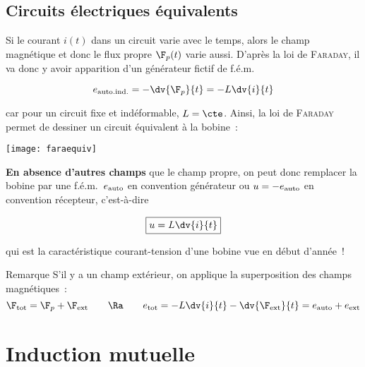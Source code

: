 \documentclass[../main/main.tex]{subfiles}
\begin{document}
\subsection{Circuits électriques équivalents}
\label{ssec:celecequiv}
Si le courant $i(t)$ dans un circuit varie avec le temps, alors le champ
magnétique et donc le flux propre $\F_p(t)$ varie aussi. D'après la loi de
\textsc{Faraday}, il va donc y avoir apparition d'un générateur fictif de
f.é.m.\
\begin{hide}
	\[
		e_{\rm auto.ind.} = -\dv{\F_p}{t} = -L \dv{i}{t}
	\]
\end{hide}
car pour un circuit fixe et indéformable, $L = \cte$. Ainsi, la loi de
\textsc{Faraday} permet de dessiner un circuit équivalent à la bobine~:
\begin{hide}
	\begin{center}
		\texttt{[image: faraequiv]}
		\label{fig:faraequiv}
	\end{center}
\end{hide}
\textbf{En absence d'autres champs} que le champ propre, on peut donc remplacer
la bobine par une f.é.m.\ $e_{\rm auto}$ en convention générateur ou $u =
	-e_{\rm auto}$ en convention récepteur, c'est-à-dire
\begin{hide}
	\[
		\boxed{u = L \dv{i}{t}}
	\]
\end{hide}
qui est la caractéristique courant-tension d'une bobine vue en début d'année~!

\begin{rrema}{Remarque}
	S'il y a un champ extérieur, on applique la superposition des champs
	magnétiques~:
	\[
		\F_{\rm tot} = \F_p + \F_{\rm ext}
		\qquad
		\Ra
		\qquad
		e_{\rm tot} = -L \dv{i}{t} - \dv{\F_{\rm ext}}{t} = e_{\rm auto} + e_{\rm ext}
	\]
\end{rrema}

\section{Induction mutuelle}
\label{sec:inducmut}
\end{document}
